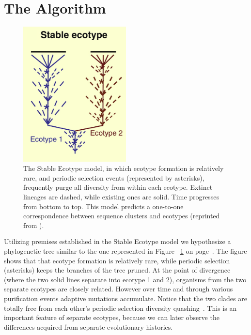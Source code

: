 \section{The Algorithm}

\begin{figure}
 \caption[Phylogenetic tree representation of typical Stable Ecotype model case.]{ The Stable Ecotype model, in which ecotype formation is relatively rare, and periodic selection events (represented by asterisks), frequently purge all diversity from within each ecotype. Extinct lineages are dashed, while existing ones are solid. Time progresses from bottom to top. This model predicts a one-to-one correspondence between sequence clusters and ecotypes (reprinted from \protect\cite{cohan2008origins}). }
 \centering
 \label{fig:StableTree}
 \includegraphics[width=0.5\textwidth]{images/StableTree-CH2}
\end{figure}

Utilizing premises established in the Stable Ecotype model we hypothesize a phylogenetic tree similar to the one represented in Figure ~\ref{fig:StableTree} on page~\pageref{fig:StableTree}.
The figure shows that that ecotype formation is relatively rare, while periodic selection (asterisks) keeps the branches of the tree pruned.
At the point of divergence (where the two solid lines separate into ecotype 1 and 2), organisms from the two separate ecotypes are closely related.
However over time and through various purification events adaptive mutations accumulate.
Notice that the two clades are totally free from each other's periodic selection diversity quashing~\cite{cohan2007systematics}.
This is an important feature of separate ecotypes, because we can later observe the differences acquired from separate evolutionary histories.

